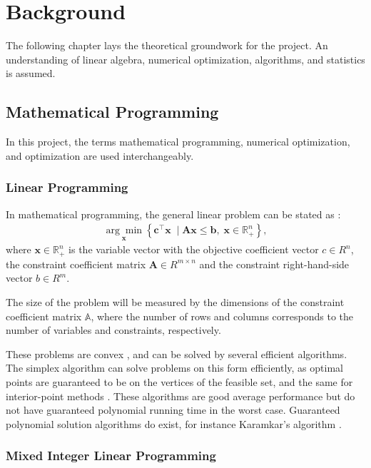 \chapter{Background}\label{cha:background}

The following chapter lays the theoretical groundwork for the project. An understanding of linear algebra, numerical optimization, algorithms, and statistics is assumed. 

\section{Mathematical Programming}

In this project, the terms mathematical programming, numerical optimization, and optimization are used interchangeably.


\subsection{Linear Programming}

In mathematical programming, the general linear problem can be stated as \cite{gasse2019exact}:
\begin{align} \label{eq:lp}
    \underset{\mathbf{x}}{\arg \min }\left\{\mathbf{c}^{\top} \mathbf{x} \; \mid \mathbf{A} \mathbf{x} \leq \mathbf{b},\; \mathbf{x} \in \mathbb{R}_+^{n}\right\},
\end{align}
where $ \mathbf{x} \in \mathbb{R}_+^n$ is the variable vector
with the objective coefficient vector $c \in R^n $, 
the constraint coefficient matrix $\mathbf{A} \in R^{m \times n}$
and the constraint right-hand-side vector $b \in R^m $.

The size of the problem will be measured by the dimensions of the constraint coefficient matrix $ \mathbb{A} $, where the number of rows and columns corresponds to the number of variables and constraints, respectively.

These problems are convex \cite{wolsey2020integer}, and can be solved by several efficient algorithms. The simplex algorithm can solve problems on this form efficiently, as optimal points are guaranteed to be on the vertices of the feasible set, and the same for interior-point methods \cite{nocedal2006numerical}. These algorithms are good average performance but do not have guaranteed polynomial running time in the worst case. Guaranteed polynomial solution algorithms do exist, for instance Karamkar's algorithm \cite{karamkar1984new}. 


\subsection{Mixed Integer Linear Programming}

